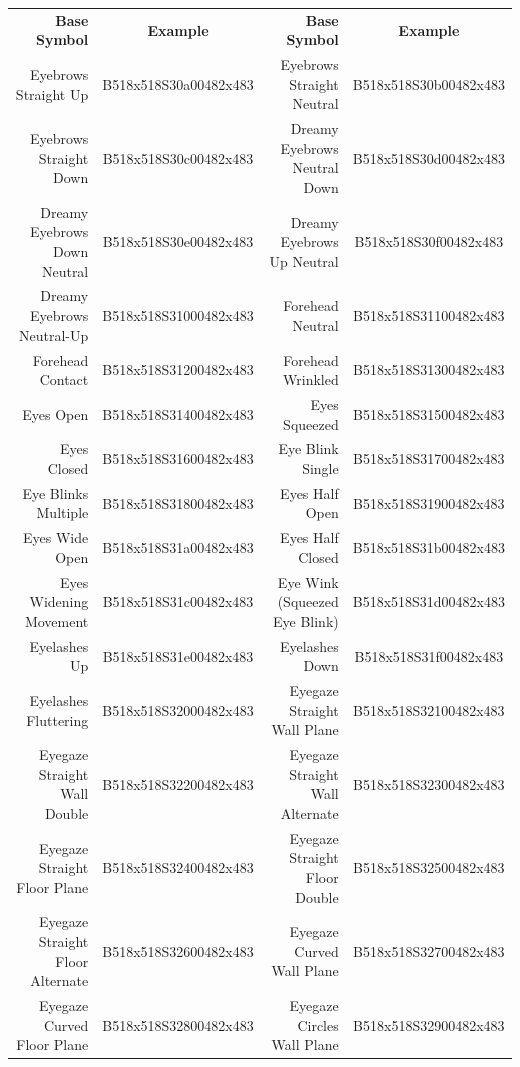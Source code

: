 \documentclass{article}
\begin{document}
\begin{center}
\begin{tabular}{rcrc}
\textbf{Base Symbol}&\textbf{Example}&\textbf{Base Symbol}&\textbf{Example}\\
Eyebrows Straight Up            &B518x518S30a00482x483&Eyebrows Straight Neutral      &B518x518S30b00482x483\\
Eyebrows Straight Down          &B518x518S30c00482x483&Dreamy Eyebrows Neutral Down   &B518x518S30d00482x483\\
Dreamy Eyebrows Down Neutral    &B518x518S30e00482x483&Dreamy Eyebrows Up Neutral     &B518x518S30f00482x483\\
Dreamy Eyebrows Neutral-Up      &B518x518S31000482x483&Forehead Neutral               &B518x518S31100482x483\\
Forehead Contact                &B518x518S31200482x483&Forehead Wrinkled              &B518x518S31300482x483\\
Eyes Open                       &B518x518S31400482x483&Eyes Squeezed                  &B518x518S31500482x483\\
Eyes Closed                     &B518x518S31600482x483&Eye Blink Single               &B518x518S31700482x483\\
Eye Blinks Multiple             &B518x518S31800482x483&Eyes Half Open                 &B518x518S31900482x483\\
Eyes Wide Open                  &B518x518S31a00482x483&Eyes Half Closed               &B518x518S31b00482x483\\
Eyes Widening Movement          &B518x518S31c00482x483&Eye Wink (Squeezed Eye Blink)  &B518x518S31d00482x483\\
Eyelashes Up                    &B518x518S31e00482x483&Eyelashes Down                 &B518x518S31f00482x483\\
Eyelashes Fluttering            &B518x518S32000482x483&Eyegaze Straight Wall Plane    &B518x518S32100482x483\\
Eyegaze Straight Wall Double    &B518x518S32200482x483&Eyegaze Straight Wall Alternate&B518x518S32300482x483\\
Eyegaze Straight Floor Plane    &B518x518S32400482x483&Eyegaze Straight Floor Double  &B518x518S32500482x483\\
Eyegaze Straight Floor Alternate&B518x518S32600482x483&Eyegaze Curved Wall Plane      &B518x518S32700482x483\\
Eyegaze Curved Floor Plane      &B518x518S32800482x483&Eyegaze Circles Wall Plane     &B518x518S32900482x483\\
\end{tabular}
\end{center}
\end{document}
